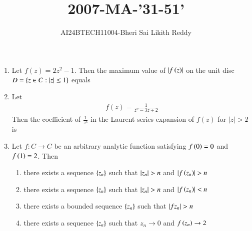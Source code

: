 \documentclass[journal]{IEEEtran}
\begin{document}

\onecolumn
\newpage
\title{2007-MA-'31-51'}
\author{AI24BTECH11004-Bheri Sai Likith Reddy}
\maketitle

\begin{enumerate}
	\item Let $f(z)=2 z^{2}-1$. Then the maximum value of $\left\vert f\left(z\right)\right\vert$ on the unit disc $D=\left\{z \in C:\left\vert z\right\vert \leq 1\right\}$ equals
	       \begin{enumerate}
        	\end{enumerate}	
	\item Let 
             \begin{align*}  
		f(z)=\frac{1}{z^{2}-3 z+2}
              \end{align*}
	         Then the coefficient of $\frac{1}{z^{3}}$ in the Laurent series expansion of $f(z)$ for $|z|>2$ is
               \begin{enumerate}
			        \begin{multicols}{4}  
		       \item $1$
		       \item $2$
		       \item $3$
		       \item $4$
                    \end{multicols}   
	       \end{enumerate}	
       \item Let $f: C \rightarrow C$ be an arbitrary analytic function satisfying $f\left(0\right)=0$ and $f\left(1\right)=2$. Then
		\begin{enumerate}
			\item there exists a sequence $\left\{z_{n}\right\}$ such that $\left\vert z_{n}\right\vert>n$ and $\left\vert f\left(z_{n}\right)\right\vert>n$
			\item there exists a sequence $\left\{z_{n}\right\}$ such that $\left\vert z_{n}\right\vert>n$ and $\left\vert f\left(z_{n}\right)\right\vert<n$
			\item there exists a bounded sequence $\left\{z_{n}\right\}$ such that $\left\vert f{z_{n}}\right\vert>n$
			\item there exists a sequence $\left\{z_{n}\right\}$ such that $z_{n} \rightarrow 0$ and $f\left(z_{n}\right) \rightarrow 2$

\end{enumerate}
\end{enumerate}
\end{document}
